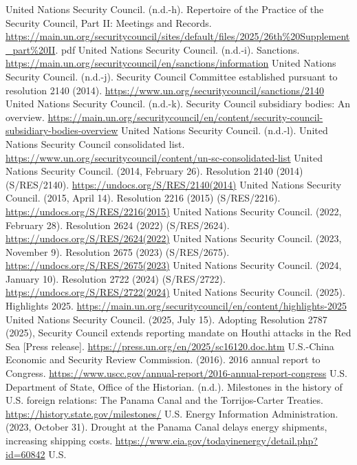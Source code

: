 \begin{referencelist}
   United Nations Security Council. (n.d.-h). Repertoire of the Practice of the Security Council, Part II: Meetings and Records. \url{https://main.un.org/securitycouncil/sites/default/files/2025/26th\%20Supplement_part\%20II}. pdf
   United Nations Security Council. (n.d.-i). Sanctions. \url{https://main.un.org/securitycouncil/en/sanctions/information}
   United Nations Security Council. (n.d.-j). Security Council Committee established pursuant to resolution 2140 (2014). \url{https://www.un.org/securitycouncil/sanctions/2140}
   United Nations Security Council. (n.d.-k). Security Council subsidiary bodies: An overview. \url{https://main.un.org/securitycouncil/en/content/security-council-subsidiary-bodies-overview}
   United Nations Security Council. (n.d.-l). United Nations Security Council consolidated list. \url{https://www.un.org/securitycouncil/content/un-sc-consolidated-list}
   United Nations Security Council. (2014, February 26). Resolution 2140 (2014) (S/RES/2140). \url{https://undocs.org/S/RES/2140(2014)}
   United Nations Security Council. (2015, April 14). Resolution 2216 (2015) (S/RES/2216). \url{https://undocs.org/S/RES/2216(2015)}
   United Nations Security Council. (2022, February 28). Resolution 2624 (2022) (S/RES/2624). \url{https://undocs.org/S/RES/2624(2022)}
   United Nations Security Council. (2023, November 9). Resolution 2675 (2023) (S/RES/2675). \url{https://undocs.org/S/RES/2675(2023)}
   United Nations Security Council. (2024, January 10). Resolution 2722 (2024) (S/RES/2722). \url{https://undocs.org/S/RES/2722(2024)}
   United Nations Security Council. (2025). Highlights 2025. \url{https://main.un.org/securitycouncil/en/content/highlights-2025}
   United Nations Security Council. (2025, July 15). Adopting Resolution 2787 (2025), Security Council extends reporting mandate on Houthi attacks in the Red Sea [Press release]. \url{https://press.un.org/en/2025/sc16120.doc.htm}
   U.S.-China Economic and Security Review Commission. (2016). 2016 annual report to Congress. \url{https://www.uscc.gov/annual-report/2016-annual-report-congress} U.S.
   Department of State, Office of the Historian. (n.d.). Milestones in the history of U.S. foreign relations: The Panama Canal and the Torrijos-Carter Treaties. \url{https://history.state.gov/milestones/}
   U.S. Energy Information Administration. (2023, October 31). Drought at the Panama Canal delays energy shipments, increasing shipping costs. \url{https://www.eia.gov/todayinenergy/detail.php?id=60842} U.S.

\end{referencelist}

